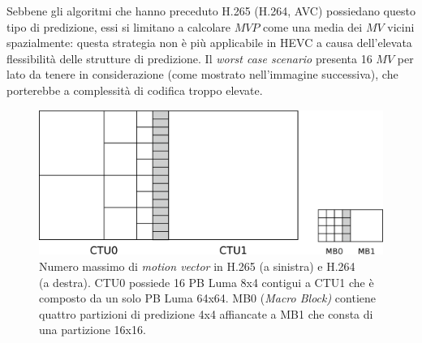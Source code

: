 Sebbene gli algoritmi che hanno preceduto H.265 (H.264, AVC) possiedano questo 
tipo di predizione, essi si limitano a calcolare $MVP$ come una media dei $MV$ 
vicini spazialmente: questa strategia non è più applicabile in HEVC a causa 
dell'elevata flessibilità delle strutture di predizione.
Il \emph{worst case scenario} presenta 16 $MV$ per lato da tenere in 
considerazione (come mostrato nell'immagine successiva), che porterebbe a 
complessità di codifica troppo elevate.

\begin{figure}[H]
  \captionsetup{justification=raggedright}
  \centering
  \includegraphics[scale=0.45]{Figures/Inter_pred_2}
  \begin{flushleft}
    \caption[Numero massimo di \emph{motion vector} in H.265 e H.264]
    {Numero massimo di \emph{motion vector} in H.265 (a sinistra) e H.264 \\
      (a destra). CTU0 possiede 16 PB Luma 8x4 contigui a CTU1 che è composto da
      un solo PB Luma 64x64. MB0 (\emph{Macro Block)} contiene quattro 
      partizioni di predizione 4x4 affiancate a MB1 che consta di una 
      partizione 16x16. }
  \end{flushleft}
\end{figure}

